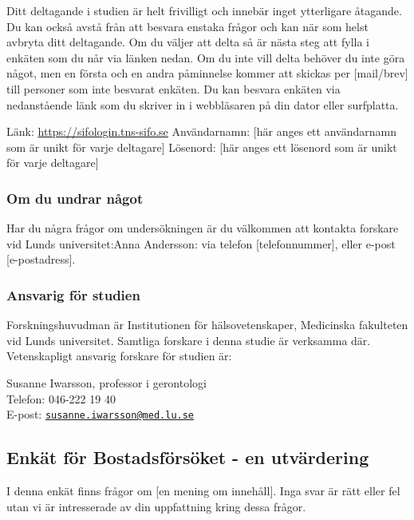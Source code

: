 \documentclass[]{tufte-handout}
\begin{document}
Ditt deltagande i studien är helt frivilligt och innebär inget
ytterligare åtagande. Du kan också avstå från att besvara enstaka frågor
och kan när som helst avbryta ditt deltagande. Om du väljer att delta så
är nästa steg att fylla i enkäten som du når via länken nedan. Om du
inte vill delta behöver du inte göra något, men en första och en andra
påminnelse kommer att skickas per {[}mail/brev{]} till personer som inte
besvarat enkäten. Du kan besvara enkäten via nedanstående länk som du
skriver in i webbläsaren på din dator eller surfplatta.

Länk: \url{https://sifologin.tns-sifo.se} Användarnamn: {[}här anges ett
användarnamn som är unikt för varje deltagare{]} Lösenord: {[}här anges
ett lösenord som är unikt för varje deltagare{]}

\hypertarget{om-du-undrar-nuxe5got}{%
\subsubsection{Om du undrar något}\label{om-du-undrar-nuxe5got}}

Har du några frågor om undersökningen är du välkommen att kontakta
forskare vid Lunds universitet:Anna Andersson: via telefon
{[}telefonnummer{]}, eller e-post {[}e-postadress{]}.

\hypertarget{ansvarig-fuxf6r-studien}{%
\subsubsection{Ansvarig för studien}\label{ansvarig-fuxf6r-studien}}

Forskningshuvudman är Institutionen för hälsovetenskaper, Medicinska
fakulteten vid Lunds universitet. Samtliga forskare i denna studie är
verksamma där. Vetenskapligt ansvarig forskare för studien är:

Susanne Iwarsson, professor i gerontologi\\
Telefon: 046-222 19 40\\
E-post:
\href{mailto:susanne.iwarsson@med.lu.se}{\nolinkurl{susanne.iwarsson@med.lu.se}}

\hypertarget{enkuxe4t-fuxf6r-bostadsfuxf6rsuxf6ket---en-utvuxe4rdering}{%
\subsection{Enkät för Bostadsförsöket - en
utvärdering}\label{enkuxe4t-fuxf6r-bostadsfuxf6rsuxf6ket---en-utvuxe4rdering}}

I denna enkät finns frågor om {[}en mening om innehåll{]}. Inga svar är
rätt eller fel utan vi är intresserade av din uppfattning kring dessa
frågor.
\end{document}

